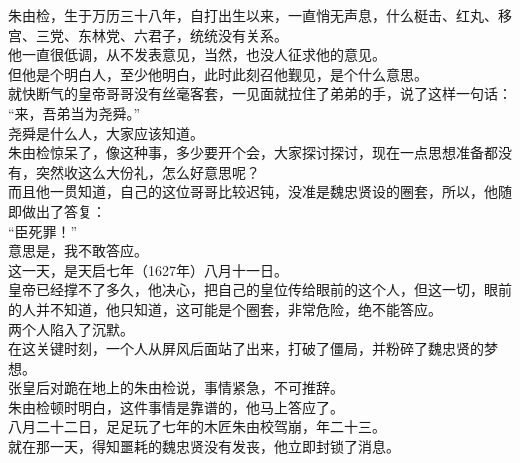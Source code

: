 \begin{multicols}{\theparacolNo}
朱由检，生于万历三十八年，自打出生以来，一直悄无声息，什么梃击、红丸、移宫、三党、东林党、六君子，统统没有关系。\\

他一直很低调，从不发表意见，当然，也没人征求他的意见。\\

但他是个明白人，至少他明白，此时此刻召他觐见，是个什么意思。\\

就快断气的皇帝哥哥没有丝毫客套，一见面就拉住了弟弟的手，说了这样一句话：\\

“来，吾弟当为尧舜。”\\

尧舜是什么人，大家应该知道。\\

朱由检惊呆了，像这种事，多少要开个会，大家探讨探讨，现在一点思想准备都没有，突然收这么大份礼，怎么好意思呢？\\

而且他一贯知道，自己的这位哥哥比较迟钝，没准是魏忠贤设的圈套，所以，他随即做出了答复：\\

“臣死罪！”\\

意思是，我不敢答应。\\

这一天，是天启七年（1627年）八月十一日。\\

皇帝已经撑不了多久，他决心，把自己的皇位传给眼前的这个人，但这一切，眼前的人并不知道，他只知道，这可能是个圈套，非常危险，绝不能答应。\\

两个人陷入了沉默。\\

在这关键时刻，一个人从屏风后面站了出来，打破了僵局，并粉碎了魏忠贤的梦想。\\

张皇后对跪在地上的朱由检说，事情紧急，不可推辞。\\

朱由检顿时明白，这件事情是靠谱的，他马上答应了。\\

八月二十二日，足足玩了七年的木匠朱由校驾崩，年二十三。\\

就在那一天，得知噩耗的魏忠贤没有发丧，他立即封锁了消息。\\
\ifnum{}
	\end{multicols}
\fi
\newpage

